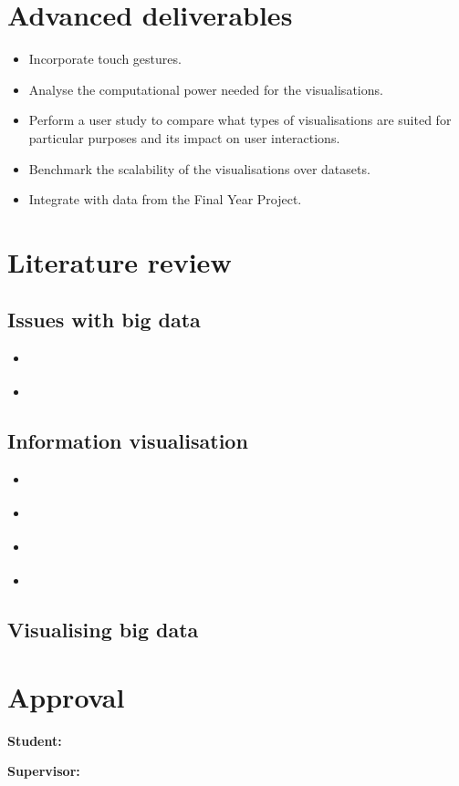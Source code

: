 \documentclass[a4paper]{article}
\begin{document}
	\section{Advanced deliverables} {
	
		\begin{itemize}
			\item Incorporate touch gestures.
			\item Analyse the computational power needed for the visualisations.
			\item Perform a user study to compare what types of visualisations are suited for particular purposes and its impact on user interactions.
			\item Benchmark the scalability of the visualisations over datasets.
			\item Integrate with data from the Final Year Project.
		\end{itemize}
	
	}
	
	\section{Literature review} {
	
		\subsection{Issues with big data} {
		
			\begin{itemize}
				\item \citet{kaisler2013big}
				\item \citet{katal2013big}		
			\end{itemize}		
		
		}
		
		\subsection{Information visualisation} {
		
			\begin{itemize}
				\item \citet{robertson1993information}
				\item \citet{rohrer1997web}
				\item \citet{ware2012information}
				\item \citet{duval2011attention}
			\end{itemize}
		
		}
		
		\subsection{Visualising big data} {
		
		}
		
	}
	
	\section{Approval} {
	
		\vspace{2em}\par
		\textbf{Student:} 
		\vspace{3em}\par
		\textbf{Supervisor:}
		
	}
	
	\newpage
	
	
	
\end{document}
